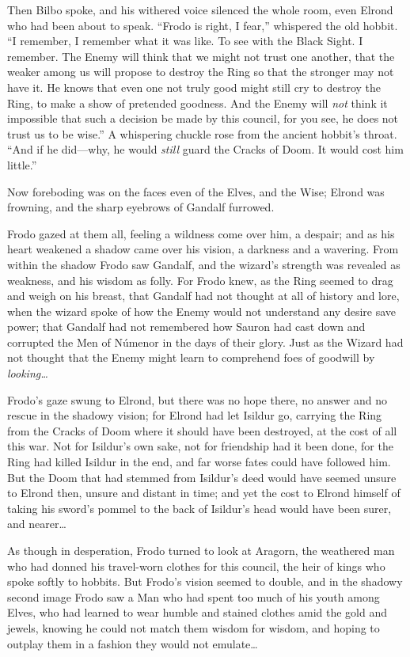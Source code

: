 Then Bilbo spoke, and his withered voice silenced the whole room, even Elrond who had been about to speak. “Frodo is right, I fear,” whispered the old hobbit. “I remember, I remember what it was like. To see with the Black Sight. I remember. The Enemy will think that we might not trust one another, that the weaker among us will propose to destroy the Ring so that the stronger may not have it. He knows that even one not truly good might still cry to destroy the Ring, to make a show of pretended goodness. And the Enemy will \emph{not} think it impossible that such a decision be made by this council, for you see, he does not trust us to be wise.” A whispering chuckle rose from the ancient hobbit’s throat. “And if he did—why, he would \emph{still} guard the Cracks of Doom. It would cost him little.”

Now foreboding was on the faces even of the Elves, and the Wise; Elrond was frowning, and the sharp eyebrows of Gandalf furrowed.

Frodo gazed at them all, feeling a wildness come over him, a despair; and as his heart weakened a shadow came over his vision, a darkness and a wavering. From within the shadow Frodo saw Gandalf, and the wizard’s strength was revealed as weakness, and his wisdom as folly. For Frodo knew, as the Ring seemed to drag and weigh on his breast, that Gandalf had not thought at all of history and lore, when the wizard spoke of how the Enemy would not understand any desire save power; that Gandalf had not remembered how Sauron had cast down and corrupted the Men of Númenor in the days of their glory. Just as the Wizard had not thought that the Enemy might learn to comprehend foes of goodwill by \emph{looking…}

Frodo’s gaze swung to Elrond, but there was no hope there, no answer and no rescue in the shadowy vision; for Elrond had let Isildur go, carrying the Ring from the Cracks of Doom where it should have been destroyed, at the cost of all this war. Not for Isildur’s own sake, not for friendship had it been done, for the Ring had killed Isildur in the end, and far worse fates could have followed him. But the Doom that had stemmed from Isildur’s deed would have seemed unsure to Elrond then, unsure and distant in time; and yet the cost to Elrond himself of taking his sword’s pommel to the back of Isildur’s head would have been surer, and nearer…

As though in desperation, Frodo turned to look at Aragorn, the weathered man who had donned his travel-worn clothes for this council, the heir of kings who spoke softly to hobbits. But Frodo’s vision seemed to double, and in the shadowy second image Frodo saw a Man who had spent too much of his youth among Elves, who had learned to wear humble and stained clothes amid the gold and jewels, knowing he could not match them wisdom for wisdom, and hoping to outplay them in a fashion they would not emulate…

